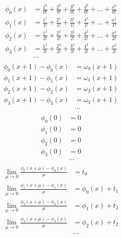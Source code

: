 \begin{equation*} \begin{aligned}
\phi_{0}(x) &=
  \frac{1^0}{0!} 
+ \frac{2^0}{0!} 
+ \frac{3^0}{0!} 
+ \frac{4^0}{0!} 
+ \ldots 
+ \frac{x^0}{0!} \\
%
\phi_{1}(x) &= 
  \frac{1^1}{1!} 
+ \frac{2^1}{1!} 
+ \frac{3^1}{1!} 
+ \frac{4^1}{1!} 
+ \ldots 
+ \frac{x^1}{1!} \\
%
\phi_{2}(x) &= 
  \frac{1^2}{2!} 
+ \frac{2^2}{2!} 
+ \frac{3^2}{2!} 
+ \frac{4^2}{2!} 
+ \ldots 
+ \frac{x^2}{2!} \\
%
\phi_{3}(x) &= 
  \frac{1^3}{3!} 
+ \frac{2^3}{3!} 
+ \frac{3^3}{3!} 
+ \frac{4^3}{3!} 
+ \ldots 
+ \frac{x^3}{3!} \\
%
&\ldots \\
\end{aligned} \end{equation*}
%
\begin{equation*} \begin{aligned}
\phi_{0}(x + 1) - \phi_{0}(x) &= \omega_{0}(x + 1) \\
\phi_{1}(x + 1) - \phi_{1}(x) &= \omega_{1}(x + 1) \\
\phi_{2}(x + 1) - \phi_{2}(x) &= \omega_{2}(x + 1) \\
\phi_{3}(x + 1) - \phi_{3}(x) &= \omega_{3}(x + 1) \\
&\ldots \\
\end{aligned} \end{equation*}
%
\begin{equation*} \begin{aligned}
\phi_{0}(0) &= 0 \\
\phi_{1}(0) &= 0 \\
\phi_{2}(0) &= 0 \\
\phi_{3}(0) &= 0 \\
&\ldots \\
\end{aligned} \end{equation*}
%
\begin{equation*} \begin{aligned}
\lim_{\mu \to 0} \frac{\phi_{0}(x + \mu) - \phi_{0}(x)}{\mu} &= t_0 \\
\lim_{\mu \to 0} \frac{\phi_{1}(x + \mu) - \phi_{1}(x)}{\mu} &= \phi_{0}(x) + t_1 \\
\lim_{\mu \to 0} \frac{\phi_{2}(x + \mu) - \phi_{2}(x)}{\mu} &= \phi_{1}(x) + t_2 \\
\lim_{\mu \to 0} \frac{\phi_{3}(x + \mu) - \phi_{3}(x)}{\mu} &= \phi_{2}(x) + t_2 \\
&\ldots \\
\end{aligned} \end{equation*}
